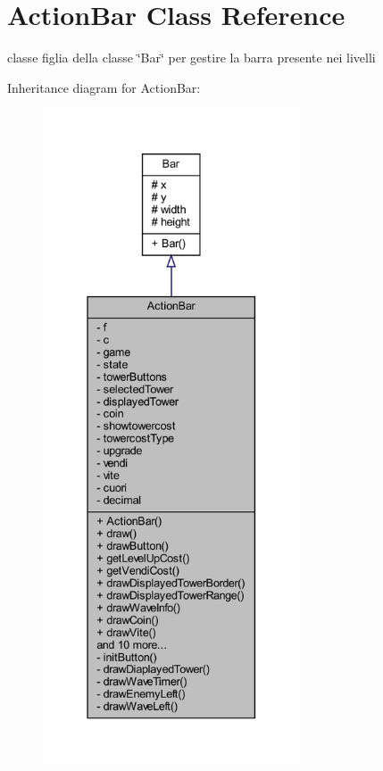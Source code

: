 \hypertarget{classui_1_1_action_bar}{}\section{Action\+Bar Class Reference}
\label{classui_1_1_action_bar}


classe figlia della classe \char`\"{}\+Bar\char`\"{} per gestire la barra presente nei livelli  




Inheritance diagram for Action\+Bar\+:\nopagebreak
\begin{figure}[H]
\begin{center}
\leavevmode
\includegraphics[height=550pt]{classui_1_1_action_bar__inherit__graph}
\end{center}
\end{figure}


